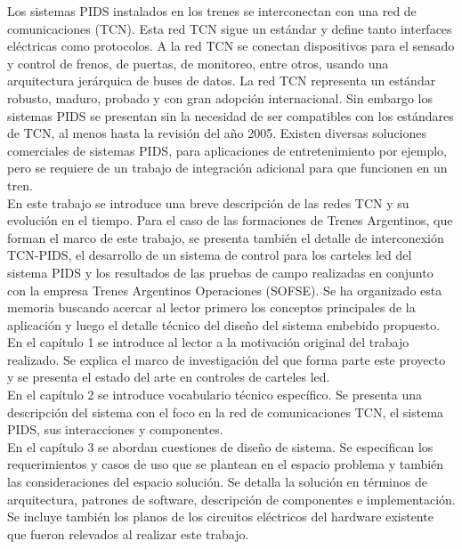  Los sistemas PIDS instalados en los trenes se interconectan con una red de comunicaciones (TCN). Esta red TCN sigue un estándar y define tanto interfaces eléctricas como protocolos. A la red TCN se conectan dispositivos para el sensado y control de frenos, de puertas, de monitoreo, entre otros, usando una arquitectura jerárquica de buses de datos. La red TCN representa un estándar robusto, maduro, probado y con gran adopción internacional. Sin embargo los sistemas PIDS se presentan sin la necesidad de ser compatibles con los estándares de TCN, al menos hasta la revisión del año 2005. Existen diversas soluciones comerciales de sistemas PIDS, para aplicaciones de entretenimiento por ejemplo, pero se requiere de un trabajo de integración adicional para que funcionen en un tren.\\
 
 En este trabajo se introduce una breve descripción de las redes TCN y su evolución en el tiempo. Para el caso de las formaciones de Trenes Argentinos, que forman el marco de este trabajo, se presenta también el detalle de interconexión TCN-PIDS, el desarrollo de un sistema de control para los carteles led del sistema PIDS y los resultados de las pruebas de campo realizadas en conjunto con la empresa Trenes Argentinos Operaciones (SOFSE). Se ha organizado esta memoria buscando acercar al lector primero los conceptos principales de la aplicación y luego el detalle técnico del diseño del sistema embebido propuesto. \\
  

En el capítulo 1 se introduce al lector a la motivación original del trabajo realizado. Se explica el marco de investigación del que forma parte este proyecto y se presenta el estado del arte en controles de carteles led.\\

En el capítulo 2 se introduce vocabulario técnico específico. Se presenta una descripción del sistema con el foco en la red de comunicaciones TCN, el sistema PIDS, sus interacciones y componentes.\\

En el capítulo 3 se abordan cuestiones de diseño de sistema. Se especifican los requerimientos y casos de uso que se plantean en el espacio problema y también las consideraciones del espacio solución. Se detalla la solución en términos de arquitectura, patrones de software, descripción de componentes e implementación. Se incluye también los planos de los circuitos eléctricos del hardware existente que fueron relevados al realizar este trabajo.\\

